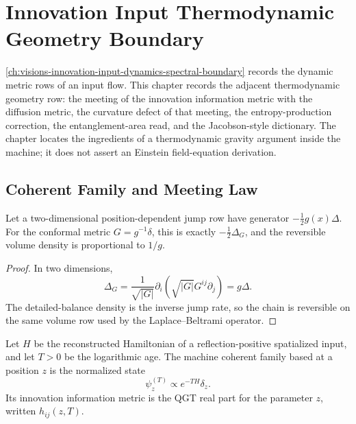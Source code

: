 \chapter{Innovation Input Thermodynamic Geometry Boundary}
\label{ch:visions-innovation-input-thermodynamic-geometry-boundary}

\autoref{ch:visions-innovation-input-dynamics-spectral-boundary} records
the dynamic metric rows of an input flow. This chapter records the adjacent
thermodynamic geometry row: the meeting of the innovation information
metric with the diffusion metric, the curvature defect of that meeting,
the entropy-production correction, the entanglement-area read, and the
Jacobson-style dictionary. The chapter locates the ingredients of a
thermodynamic gravity argument inside the machine; it does not assert an
Einstein field-equation derivation.

\section{Coherent Family and Meeting Law}
\label{sec:innovation-input-thermo-meeting-law}

\begin{lemma}
\label{lem:innovation-input-thermo-two-dimensional-conformal-exactness}
Let a two-dimensional position-dependent jump row have generator
$-\frac12g(x)\Delta$. For the conformal metric $G=g^{-1}\delta$, this is
exactly $-\frac12\Delta_G$, and the reversible volume density is
proportional to $1/g$.
\end{lemma}

\begin{proof}
In two dimensions,
$$
\Delta_G
=
\frac{1}{\sqrt{|G|}}
\partial_i\left(\sqrt{|G|}G^{ij}\partial_j\right)
=
g\Delta.
$$
The detailed-balance density is the inverse jump rate, so the chain is
reversible on the same volume row used by the Laplace--Beltrami operator.
\end{proof}

\begin{definition}
\label{def:innovation-input-thermo-machine-coherent-family}
Let $H$ be the reconstructed Hamiltonian of a reflection-positive
spatialized input, and let $T>0$ be the logarithmic age. The machine
coherent family based at a position $z$ is the normalized state
$$
\psi_z^{(T)}
\propto
e^{-TH}\delta_z.
$$
Its innovation information metric is the QGT real part for the parameter
$z$, written $h_{ij}(z,T)$.
\end{definition}

